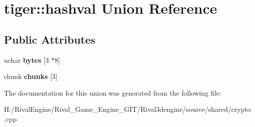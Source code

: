 \hypertarget{uniontiger_1_1hashval}{}\section{tiger\+:\+:hashval Union Reference}
\label{uniontiger_1_1hashval}
\subsection*{Public Attributes}
\begin{DoxyCompactItemize}
\item 
\mbox{\label{uniontiger_1_1hashval_a60762fc3ee7fc547c020f50966313e89}} 
uchar {\bfseries bytes} \mbox{[}3 $\ast$8\mbox{]}
\item 
\mbox{\label{uniontiger_1_1hashval_ac4b524d3ed4b6a1f60bf9f8ce493ecb5}} 
chunk {\bfseries chunks} \mbox{[}3\mbox{]}
\end{DoxyCompactItemize}


The documentation for this union was generated from the following file\+:\begin{DoxyCompactItemize}
\item 
H\+:/\+Rival\+Engine/\+Rival\+\_\+\+Game\+\_\+\+Engine\+\_\+\+G\+I\+T/\+Rival3dengine/source/shared/crypto.\+cpp\end{DoxyCompactItemize}
